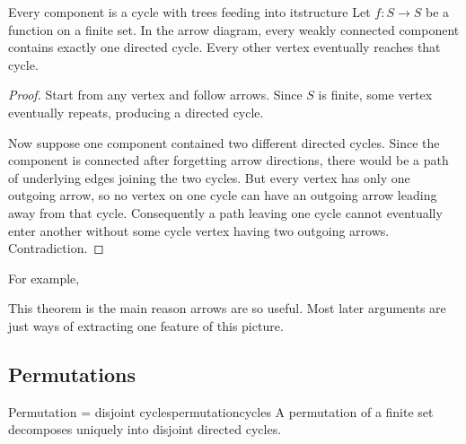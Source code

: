 \documentclass[11pt]{scrartcl}
\begin{document}
\begin{theorem}{Every component is a cycle with trees feeding into it}{structure}
Let \(f:S\to S\) be a function on a finite set. In the arrow diagram, every weakly connected component contains exactly one directed cycle. Every other vertex eventually reaches that cycle.
\end{theorem}

\begin{proof}
Start from any vertex and follow arrows. Since \(S\) is finite, some vertex eventually repeats, producing a directed cycle.

Now suppose one component contained two different directed cycles. Since the component is connected after forgetting arrow directions, there would be a path of underlying edges joining the two cycles. But every vertex has only one outgoing arrow, so no vertex on one cycle can have an outgoing arrow leading away from that cycle. Consequently a path leaving one cycle cannot eventually enter another without some cycle vertex having two outgoing arrows. Contradiction.
\end{proof}

For example,

\begin{center}
\end{center}

This theorem is the main reason arrows are so useful. Most later arguments are just ways of extracting one feature of this picture.

\subsection{Permutations}

\begin{theorem}{Permutation = disjoint cycles}{permutationcycles}
A permutation of a finite set decomposes uniquely into disjoint directed cycles.
\end{theorem}
\end{document}
